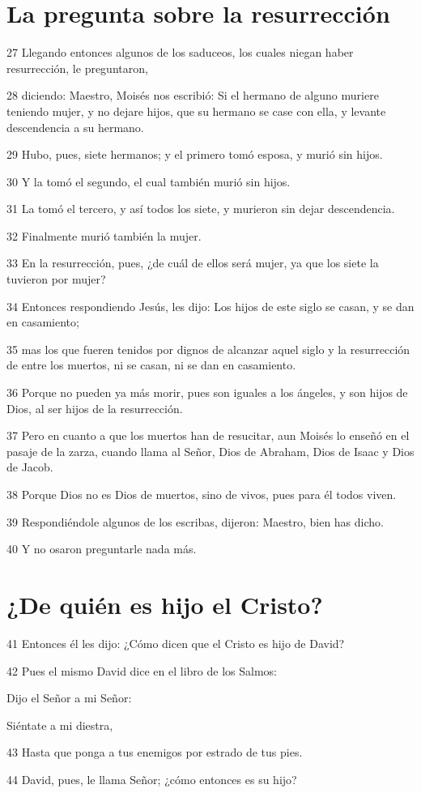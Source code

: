 \section*{La pregunta sobre la resurrección}

\par 27 Llegando entonces algunos de los saduceos, los cuales niegan haber resurrección, le preguntaron,
\par 28 diciendo: Maestro, Moisés nos escribió: Si el hermano de alguno muriere teniendo mujer, y no dejare hijos, que su hermano se case con ella, y levante descendencia a su hermano.
\par 29 Hubo, pues, siete hermanos; y el primero tomó esposa, y murió sin hijos.
\par 30 Y la tomó el segundo, el cual también murió sin hijos.
\par 31 La tomó el tercero, y así todos los siete, y murieron sin dejar descendencia.
\par 32 Finalmente murió también la mujer.
\par 33 En la resurrección, pues, ¿de cuál de ellos será mujer, ya que los siete la tuvieron por mujer?
\par 34 Entonces respondiendo Jesús, les dijo: Los hijos de este siglo se casan, y se dan en casamiento;
\par 35 mas los que fueren tenidos por dignos de alcanzar aquel siglo y la resurrección de entre los muertos, ni se casan, ni se dan en casamiento.
\par 36 Porque no pueden ya más morir, pues son iguales a los ángeles, y son hijos de Dios, al ser hijos de la resurrección.
\par 37 Pero en cuanto a que los muertos han de resucitar, aun Moisés lo enseñó en el pasaje de la zarza, cuando llama al Señor, Dios de Abraham, Dios de Isaac y Dios de Jacob.
\par 38 Porque Dios no es Dios de muertos, sino de vivos, pues para él todos viven.
\par 39 Respondiéndole algunos de los escribas, dijeron: Maestro, bien has dicho.
\par 40 Y no osaron preguntarle nada más.

\section*{¿De quién es hijo el Cristo?}

\par 41 Entonces él les dijo: ¿Cómo dicen que el Cristo es hijo de David?
\par 42 Pues el mismo David dice en el libro de los Salmos:
\par Dijo el Señor a mi Señor:
\par Siéntate a mi diestra,
\par 43 Hasta que ponga a tus enemigos por estrado de tus pies.
\par 44 David, pues, le llama Señor; ¿cómo entonces es su hijo?

